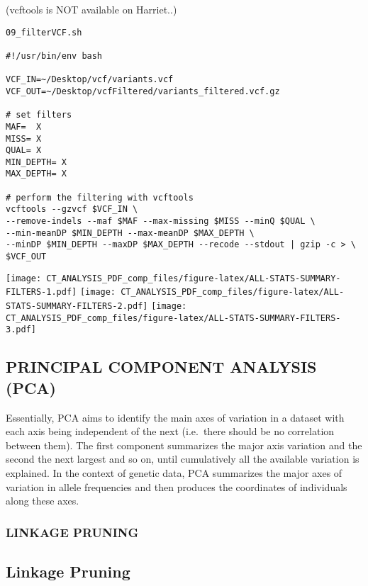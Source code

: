 \documentclass[
]{article}
\begin{document}
(vcftools is NOT available on Harriet..)

\begin{verbatim}
09_filterVCF.sh

#!/usr/bin/env bash

VCF_IN=~/Desktop/vcf/variants.vcf
VCF_OUT=~/Desktop/vcfFiltered/variants_filtered.vcf.gz

# set filters
MAF=  X
MISS= X
QUAL= X
MIN_DEPTH= X
MAX_DEPTH= X

# perform the filtering with vcftools
vcftools --gzvcf $VCF_IN \
--remove-indels --maf $MAF --max-missing $MISS --minQ $QUAL \
--min-meanDP $MIN_DEPTH --max-meanDP $MAX_DEPTH \
--minDP $MIN_DEPTH --maxDP $MAX_DEPTH --recode --stdout | gzip -c > \
$VCF_OUT
\end{verbatim}

\texttt{[image: CT\_ANALYSIS\_PDF\_comp\_files/figure-latex/ALL-STATS-SUMMARY-FILTERS-1.pdf]}
\texttt{[image: CT\_ANALYSIS\_PDF\_comp\_files/figure-latex/ALL-STATS-SUMMARY-FILTERS-2.pdf]}
\texttt{[image: CT\_ANALYSIS\_PDF\_comp\_files/figure-latex/ALL-STATS-SUMMARY-FILTERS-3.pdf]}

\hypertarget{principal-component-analysis-pca}{%
\subsection{PRINCIPAL COMPONENT ANALYSIS
(PCA)}\label{principal-component-analysis-pca}}

Essentially, PCA aims to identify the main axes of variation in a
dataset with each axis being independent of the next (i.e.~there should
be no correlation between them). The first component summarizes the
major axis variation and the second the next largest and so on, until
cumulatively all the available variation is explained. In the context of
genetic data, PCA summarizes the major axes of variation in allele
frequencies and then produces the coordinates of individuals along these
axes.

\hypertarget{linkage-pruning}{%
\subsubsection{LINKAGE PRUNING}\label{linkage-pruning}}

\hypertarget{linkage-pruning-1}{%
\subsection{Linkage Pruning}\label{linkage-pruning-1}}
\end{document}
